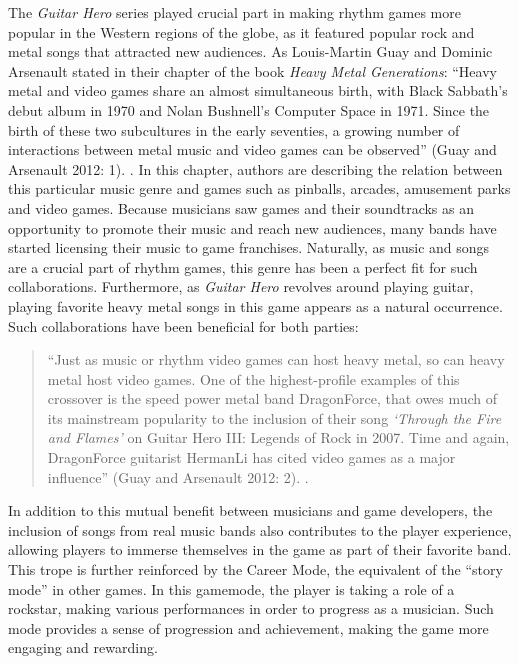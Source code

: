 The \textit{Guitar Hero} series played crucial part in making rhythm games more popular in the Western regions of the globe, as it featured popular rock and metal songs that attracted new audiences. As Louis-Martin Guay and Dominic Arsenault stated in their chapter of the book \textit{Heavy Metal Generations}: ``Heavy metal and video games share an almost simultaneous birth, with Black Sabbath’s debut album in 1970 and Nolan Bushnell’s Computer Space in 1971. Since the birth of these two subcultures in the early seventies, a growing number of interactions between metal music and video games can be observed'' (Guay and Arsenault 2012: 1). \cite{heavymetal}. In this chapter, authors are describing the relation between this particular music genre and games such as pinballs, arcades, amusement parks and video games. Because musicians saw games and their soundtracks as an opportunity to promote their music and reach new audiences, many bands have started licensing their music to game franchises. Naturally, as music and songs are a crucial part of rhythm games, this genre has been a perfect fit for such collaborations. Furthermore, as \textit{Guitar Hero} revolves around playing guitar, playing favorite heavy metal songs in this game appears as a natural occurrence. Such collaborations have been beneficial for both parties:
\begin{quote}
    ``Just as music or rhythm video games can host heavy metal, so can heavy metal host video games. One of the highest-profile examples of this crossover is the speed power metal band DragonForce, that owes much of its mainstream popularity to the inclusion of their song \textit{‘Through the Fire and Flames’} on Guitar Hero III: Legends of Rock in 2007. Time and again, DragonForce guitarist HermanLi has cited video games as a major influence'' (Guay and Arsenault 2012: 2). \cite{heavymetal}.
\end{quote}
In addition to this mutual benefit between musicians and game developers, the inclusion of songs from real music bands also contributes to the player experience, allowing players to immerse themselves in the game as part of their favorite band. This trope is further reinforced by the Career Mode, the equivalent of the ``story mode'' in other games. In this gamemode, the player is taking a role of a rockstar, making various performances in order to progress as a musician. Such mode provides a sense of progression and achievement, making the game more engaging and rewarding.


